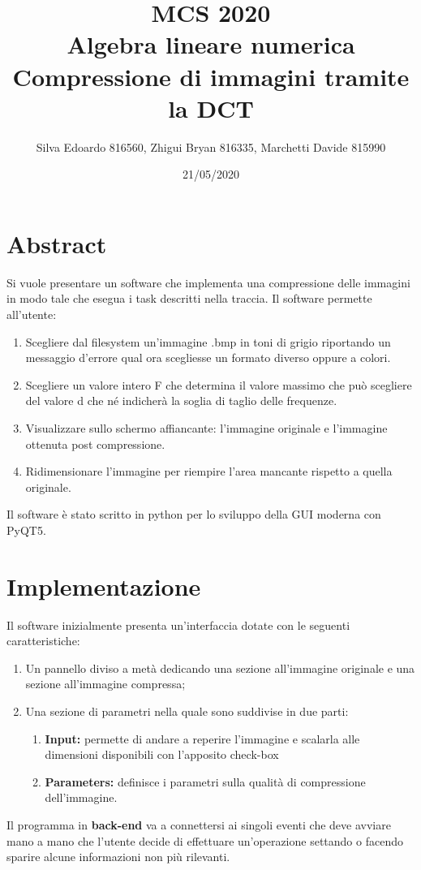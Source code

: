 \documentclass[12pt]{article}
\title{%
  MCS 2020 \\
  \large Algebra lineare numerica \\
   Compressione di immagini tramite la DCT}
\date{21/05/2020}
\author{Silva Edoardo 816560, Zhigui Bryan 816335, Marchetti Davide 815990}
\begin{document}
\maketitle

\section{Abstract}

	Si vuole presentare un software che implementa una compressione delle immagini in modo tale che esegua i task descritti nella traccia.
	\newline
	Il software permette all’utente:
	\begin{enumerate}
		\item Scegliere dal filesystem un’immagine .bmp in toni di grigio riportando un messaggio d’errore qual ora scegliesse un formato diverso oppure a colori.
	 	\item Scegliere un valore intero F che determina il valore massimo che può scegliere del valore d che né indicherà la soglia di taglio delle frequenze.
 		\item Visualizzare sullo schermo affiancante: l’immagine originale e l’immagine ottenuta post compressione.
		\item Ridimensionare l’immagine per riempire l’area mancante rispetto a quella originale.
	\end{enumerate}
	
Il software è stato scritto in python per lo sviluppo della GUI moderna con PyQT5.
\newpage
\section{Implementazione}
	
	Il software inizialmente presenta un’interfaccia dotate con le seguenti caratteristiche:
	\begin{enumerate}
		\item Un pannello diviso a metà dedicando una sezione all’immagine originale e una sezione all’immagine compressa;
		\item Una sezione di parametri nella quale sono suddivise in due parti:
		\begin{enumerate}[label=\Alph*]
			\item \textbf{Input:} permette di andare a reperire l’immagine e scalarla alle dimensioni disponibili con l’apposito check-box
			\item \textbf{Parameters:} definisce i parametri sulla qualità di compressione dell’immagine.
		\end{enumerate}
	\end{enumerate}
	Il programma in \textbf{back-end} va a connettersi ai singoli eventi che deve avviare mano a mano che l’utente decide di effettuare un’operazione settando o facendo sparire alcune informazioni non più rilevanti.
	
\end{document}
